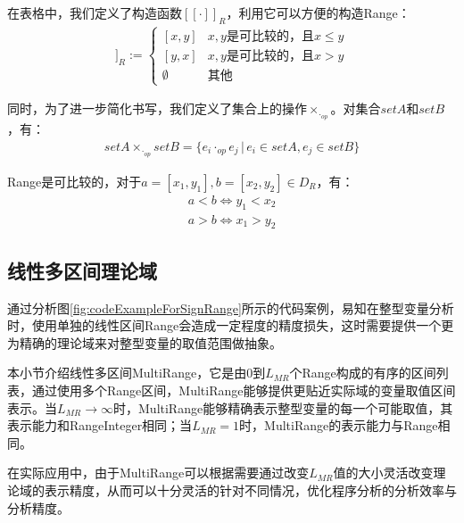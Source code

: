 在表格中，我们定义了构造函数$ [[\cdot]]_R $，利用它可以方便的构造Range：
\begin{align}
[[x, y]]_R := \begin{cases}
[x, y] & x, y \text{是可比较的，且}  x \le y\\
[y, x] & x, y \text{是可比较的，且}  x > y\\
\emptyset & \text{其他}
\end{cases}
\end{align}

同时，为了进一步简化书写，我们定义了集合上的操作$ \times_{\cdot_{op}} $。对集合$ setA $和$ setB $，有：
\begin{align}
setA  \times_{\cdot_{op}} setB =  \{ e_i \cdot_{op} e_j \, | \, e_i \in setA, e_j \in setB \} 
\end{align}

Range是可比较的，对于$ a = [x_1, y_1], b = [x_2, y_2] \in D_R $，有：
\begin{align}
	a < b \iff y_1 < x_2\\
	a > b \iff x_1 > y_2
\end{align}

\subsection{线性多区间理论域}
\label{sec:MultiRange}

通过分析图\ref{fig:codeExampleForSignRange}所示的代码案例，易知在整型变量分析时，使用单独的线性区间Range会造成一定程度的精度损失，这时需要提供一个更为精确的理论域来对整型变量的取值范围做抽象。

本小节介绍线性多区间MultiRange，它是由0到$ L_{MR} $个Range构成的有序的区间列表，通过使用多个Range区间，MultiRange能够提供更贴近实际域的变量取值区间表示。当$ L_{MR}  \rightarrow \infty $时，MultiRange能够精确表示整型变量的每一个可能取值，其表示能力和RangeInteger相同；当$ L_{MR} = 1 $时，MultiRange的表示能力与Range相同。

在实际应用中，由于MultiRange可以根据需要通过改变$ L_{MR} $值的大小灵活改变理论域的表示精度，从而可以十分灵活的针对不同情况，优化程序分析的分析效率与分析精度。

